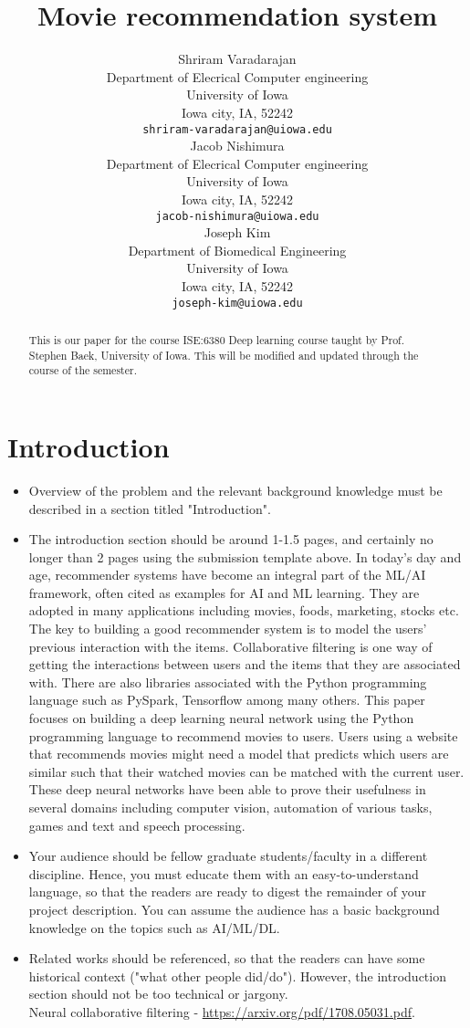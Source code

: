 \documentclass{article}
\title{Movie recommendation system}
\author{
  Shriram Varadarajan \\
  Department of Elecrical Computer engineering\\
  University of Iowa\\
  Iowa city, IA, 52242 \\
  \texttt{shriram-varadarajan@uiowa.edu} \\
   \And
 Jacob Nishimura \\
  Department of Elecrical Computer engineering\\
  University of Iowa\\
  Iowa city, IA, 52242 \\
  \texttt{jacob-nishimura@uiowa.edu} \\
\And
Joseph Kim \\
  Department of Biomedical Engineering\\
  University of Iowa\\
  Iowa city, IA, 52242 \\
  \texttt{joseph-kim@uiowa.edu} \\
}
\begin{document}
\maketitle

\begin{abstract}
This is our paper for the course ISE:6380 Deep learning course taught by Prof. Stephen Baek, University of Iowa. This will be modified and updated through the course of the semester. 
\end{abstract}




\section{Introduction}
\begin{itemize}
\item Overview of the problem and the relevant background knowledge must be described in a section titled "Introduction". 
\item The introduction section should be around 1-1.5 pages, and certainly no longer than 2 pages using the submission template above.
In today's day and age, recommender systems have become an integral part of the ML/AI framework, often cited as examples for AI and ML learning. They are adopted in many applications including movies, foods, marketing, stocks etc. The key to building a good recommender system is to model the users' previous
interaction with the items. Collaborative filtering is one way of getting the interactions between users and the items that they are associated with. There are also libraries associated with the Python programming language such as PySpark, Tensorflow among many others. 
This paper focuses on building a deep learning neural network using the Python programming language to recommend movies to users. 
Users using a website that recommends movies might need a model that predicts which users are similar such that their watched movies can be matched with the current user. 
These deep neural networks have been able to prove their usefulness in several domains including computer vision, automation of various tasks, games and text and speech processing.
\item Your audience should be fellow graduate students/faculty in a different discipline. Hence, you must educate them with an easy-to-understand language, so that the readers are ready to digest the remainder of your project description. You can assume the audience has a basic background knowledge on the topics such as AI/ML/DL. 
\item Related works should be referenced, so that the readers can have some historical context ("what other people did/do"). However, the introduction section should not be too technical or jargony.\\
Neural collaborative filtering - \url{https://arxiv.org/pdf/1708.05031.pdf}. \\

\end{itemize}
\end{document}
